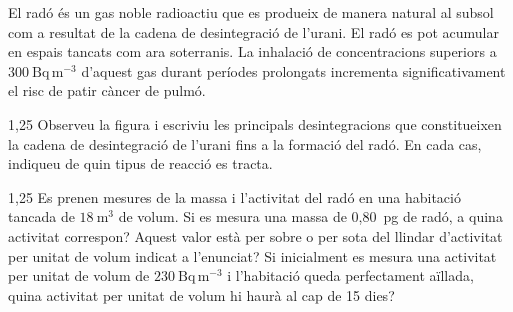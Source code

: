 El radó és un gas noble radioactiu que es produeix de manera natural al subsol com a resultat de la cadena de desintegració de l'urani. El radó es pot acumular en espais tancats com ara soterranis. La inhalació de concentracions superiors a $300\ \mathrm{Bq\,m^{-3}}$ d'aquest gas durant períodes prolongats incrementa significativament el risc de patir càncer de pulmó.

\begin{apartat}{1,25}
Observeu la figura i escriviu les principals desintegracions que constitueixen la cadena de desintegració de l'urani fins a la formació del radó. En cada cas, indiqueu de quin tipus de reacció es tracta.
\end{apartat}

\begin{apartat}{1,25}
Es prenen mesures de la massa i l'activitat del radó en una habitació tancada de $18\ \mathrm{m^3}$ de volum. Si es mesura una massa de 0,80~pg de radó, a quina activitat correspon? Aquest valor està per sobre o per sota del llindar d'activitat per unitat de volum indicat a l'enunciat? Si inicialment es mesura una activitat per unitat de volum de $230\ \mathrm{Bq\,m^{-3}}$ i l'habitació queda perfectament aïllada, quina activitat per unitat de volum hi haurà al cap de 15 dies?
\end{apartat}


